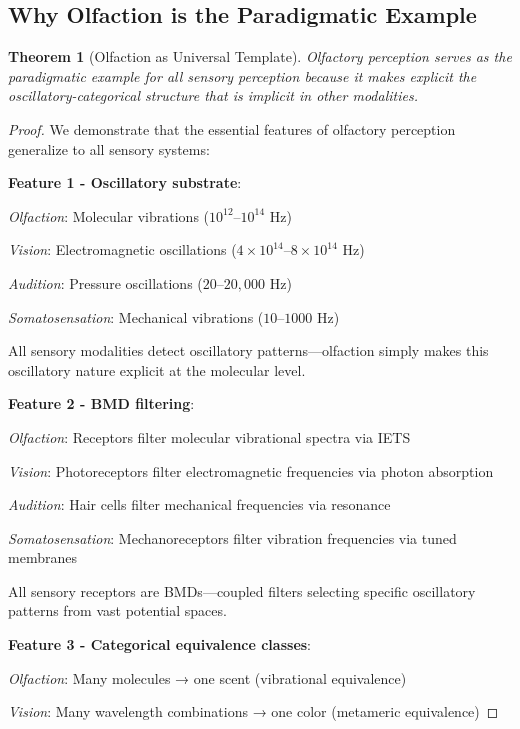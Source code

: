 \documentclass[12pt,a4paper]{article}
\newtheorem{theorem}{Theorem}
\begin{document}
\subsection{Why Olfaction is the Paradigmatic Example}

\begin{theorem}[Olfaction as Universal Template]
\label{thm:olfaction_paradigm}
Olfactory perception serves as the paradigmatic example for \textit{all} sensory perception because it makes explicit the oscillatory-categorical structure that is implicit in other modalities.
\end{theorem}

\begin{proof}
We demonstrate that the essential features of olfactory perception generalize to all sensory systems:

\textbf{Feature 1 - Oscillatory substrate}:

\textit{Olfaction}: Molecular vibrations ($10^{12}$--$10^{14}$ Hz)

\textit{Vision}: Electromagnetic oscillations ($4 \times 10^{14}$--$8 \times 10^{14}$ Hz)

\textit{Audition}: Pressure oscillations ($20$--$20,000$ Hz)

\textit{Somatosensation}: Mechanical vibrations ($10$--$1000$ Hz)

All sensory modalities detect oscillatory patterns—olfaction simply makes this oscillatory nature explicit at the molecular level.

\textbf{Feature 2 - BMD filtering}:

\textit{Olfaction}: Receptors filter molecular vibrational spectra via IETS

\textit{Vision}: Photoreceptors filter electromagnetic frequencies via photon absorption

\textit{Audition}: Hair cells filter mechanical frequencies via resonance

\textit{Somatosensation}: Mechanoreceptors filter vibration frequencies via tuned membranes

All sensory receptors are BMDs—coupled filters selecting specific oscillatory patterns from vast potential spaces.

\textbf{Feature 3 - Categorical equivalence classes}:

\textit{Olfaction}: Many molecules → one scent (vibrational equivalence)

\textit{Vision}: Many wavelength combinations → one color (metameric equivalence)


\end{proof}
\end{document}
